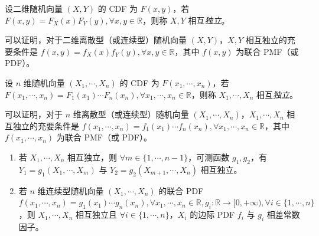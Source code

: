 \documentclass[../main.tex]{subfiles}
\begin{document}
\begin{definition}\label{def:3.6.1}
设二维随机向量 $(X,Y)$ 的 CDF 为 $F(x,y)$，若 $F(x,y)=F_X(x)F_Y(y),\forall x,y\in\mathbb R$，则称 $X,Y$ 相互\emph{独立}。
\end{definition}

可以证明，对于二维离散型（或连续型）随机向量 $(X,Y)$，$X,Y$ 相互独立的充要条件是 $f(x,y)=f_X(x)f_Y(y),\forall x,y\in\mathbb R$，其中 $f(x,y)$ 为联合 PMF（或 PDF）。

\begin{definition}\label{def:3.6.2}
设 $n$ 维随机向量 $(X_1,\cdots,X_n)$ 的 CDF 为 $F(x_1,\cdots,x_n)$，若 $F(x_1,\cdots,x_n)=F_{1}(x_1)\cdots F_n(x_n),\forall x_1,\cdots,x_n\in\mathbb R$，则称 $X_1,\cdots,X_n$ 相互\emph{独立}。
\end{definition}

可以证明，对于 $n$ 维离散型（或连续型）随机向量 $(X_1,\cdots,X_n)$，$X_1,\cdots,X_n$ 相互独立的充要条件是 $f(x_1,\cdots,x_n)=f_1(x_1)\cdots f_n(x_n),\forall x_1,\cdots,x_n\in\mathbb R$，其中 $f(x_1,\cdots,x_n)$ 为联合 PMF（或 PDF）。

\begin{theorem}\label{thm:3.6.1}
\begin{enumerate}
    \item 若 $X_1,\cdots,X_n$ 相互独立，则 $\forall m\in\{1,\cdots,n-1\}$，可测函数 $g_1,g_2$，有 $Y_1=g_1(X_1,\cdots,X_m)$ 与 $Y_2=g_2(X_{m+1},\cdots,X_n)$ 相互独立。
    \item 若 $n$ 维连续型随机向量 $(X_1,\cdots,X_n)$ 的联合 PDF $f(x_1,\cdots,x_n)=g_1(x_1)\cdots g_n(x_n),\forall x_1,\cdots,x_n\in\mathbb R,g_i:\mathbb R\rightarrow [0,+\infty),\forall i\in\{1,\cdots,n\}$，则 $X_1,\cdots,X_n$ 相互独立且 $\forall i\in\{1,\cdots,n\}$，$X_i$ 的边际 PDF $f_i$ 与 $g_i$ 相差常数因子。
\end{enumerate}
\end{theorem}
\end{document}
